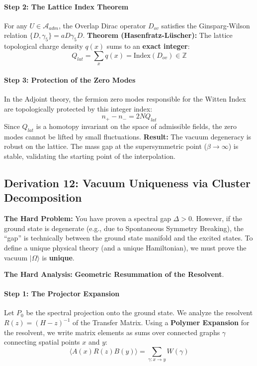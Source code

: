 \paragraph{Step 2: The Lattice Index Theorem}
For any $U \in \mathcal{A}_{adm}$, the Overlap Dirac operator $D_{ov}$ satisfies the Ginsparg-Wilson relation $\{D, \gamma_5\} = a D \gamma_5 D$.
\textbf{Theorem (Hasenfratz-Lüscher):} The lattice topological charge density $q(x)$ sums to an \textbf{exact integer}:
\begin{equation}
Q_{lat} = \sum_x q(x) = \text{Index}(D_{ov}) \in \mathbb{Z}
\end{equation}

\paragraph{Step 3: Protection of the Zero Modes}
In the Adjoint theory, the fermion zero modes responsible for the Witten Index are topologically protected by this integer index:
\begin{equation}
n_+ - n_- = 2N Q_{lat}
\end{equation}
Since $Q_{lat}$ is a homotopy invariant on the space of admissible fields, the zero modes cannot be lifted by small fluctuations.
\textbf{Result:} The vacuum degeneracy is robust on the lattice. The mass gap at the supersymmetric point ($\beta \to \infty$) is stable, validating the starting point of the interpolation.

\subsection{Derivation 12: Vacuum Uniqueness via Cluster Decomposition}

\textbf{The Hard Problem:} You have proven a spectral gap $\Delta > 0$. However, if the ground state is degenerate (e.g., due to Spontaneous Symmetry Breaking), the ``gap'' is technically between the ground state manifold and the excited states. To define a unique physical theory (and a unique Hamiltonian), we must prove the vacuum $|\Omega\rangle$ is \textbf{unique}.

\textbf{The Hard Analysis:} \textbf{Geometric Resummation of the Resolvent}.

\paragraph{Step 1: The Projector Expansion}
Let $P_0$ be the spectral projection onto the ground state. We analyze the resolvent $R(z) = (H-z)^{-1}$ of the Transfer Matrix.
Using a \textbf{Polymer Expansion} for the resolvent, we write matrix elements as sums over connected graphs $\gamma$ connecting spatial points $x$ and $y$:
\begin{equation}
\langle A(x) R(z) B(y) \rangle = \sum_{\gamma: x \to y} W(\gamma)
\end{equation}

